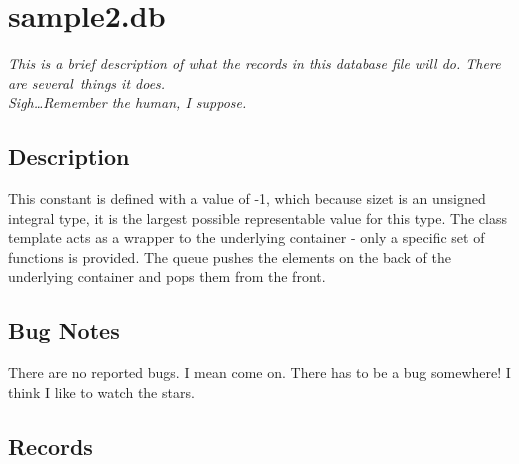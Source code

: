 \documentclass[12pt]{article}
\begin{document}
\section{ sample2.db\ }
\textit{ This is a brief description of what the records in this database file will do. There are several\ things it does.\\ Sigh\dots  Remember the human, I suppose.\ \ }
\subsection{Description}

 This constant is defined with a value of -1, which because size\textunderscore t is an unsigned integral type, it is the largest possible representable value for this type. The class template acts as a wrapper to the underlying container - only a specific set of functions is provided. 
 The queue pushes the elements on the back of the underlying container and pops them from the front.
\subsection{Bug Notes}
 There are no reported bugs. I mean come on. There has to be a bug somewhere! I think I like to watch the stars.


 
\subsection{Records}
\end{document}
